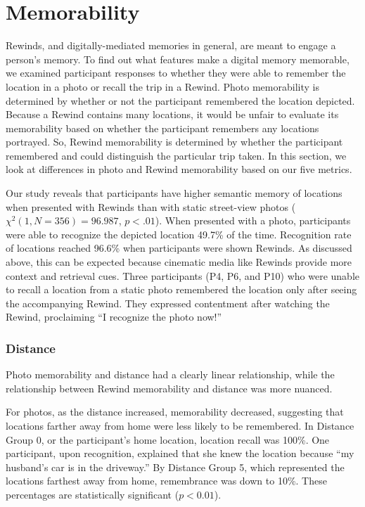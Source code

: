 \documentclass{sigchi}
\begin{document}
\section{Memorability}
Rewinds, and digitally-mediated memories in general, are meant to engage a person's memory. To find out what features make a digital memory memorable, we examined participant responses to whether they were able to remember the location in a photo or recall the trip in a Rewind. Photo memorability is determined by whether or not the participant remembered the location depicted. Because a Rewind contains many locations, it would be unfair to evaluate its memorability based on whether the participant remembers any locations portrayed. So, Rewind memorability is determined by whether the participant remembered and could distinguish the particular trip taken. In this section, we look at differences in photo and Rewind memorability based on our five metrics.

Our study reveals that participants have higher semantic memory of locations when presented with Rewinds than with static street-view photos ($\chi^2(1, N=356) = 96.987$, $p < .01$). When presented with a photo, participants were able to recognize the depicted location 49.7\% of the time. Recognition rate of locations reached 96.6\% when participants were shown Rewinds. As discussed above, this can be expected because cinematic media like Rewinds provide more context and retrieval cues. Three participants (P4, P6, and P10) who were unable to recall a location from a static photo remembered the location only after seeing the accompanying Rewind. They expressed contentment after watching the Rewind, proclaiming ``I recognize the photo now!''

\subsubsection{Distance}
Photo memorability and distance had a clearly linear relationship, while the relationship between Rewind memorability and distance was more nuanced. 

For photos, as the distance increased, memorability decreased, suggesting that locations farther away from home were less likely to be remembered. In Distance Group 0, or the participant's home location, location recall was 100\%. One participant, upon recognition, explained that she knew the location because ``my husband's car is in the driveway.'' By Distance Group 5, which represented the locations farthest away from home, remembrance was down to 10\%. These percentages are statistically significant ($p < 0.01$). 
\end{document}
